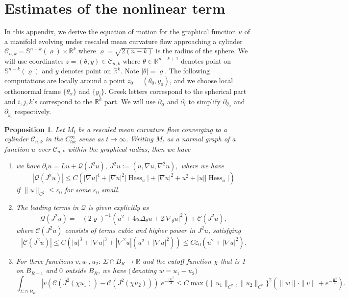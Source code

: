 \documentclass[11pt]{amsart}
\numberwithin{equation}{section}
\newtheorem{proposition}[theorem]{Proposition}
\numberwithin{equation}{section}
\newcommand{\eps}{\varepsilon}
\newcommand{\bS}{\mathbb{S}}
\newcommand{\cC}{\mathcal{C}}
\newcommand{\cQ}{\mathcal{Q}}
\newcommand{\R}{\mathbb{R}}
\newcommand{\pr}{\partial}
\DeclareMathOperator{\Hess}{Hess}
\begin{document}
	\section{Estimates of the nonlinear term}\label{appendix:Nonlinear estimate}	
	In this appendix, we derive the equation of motion for the graphical function $u$ of a manifold evolving under rescaled mean curvature flow approaching a cylinder $\cC_{n,k}=\bS^{n-k}(\varrho)\times \R^{k}$ where $\varrho=\sqrt{2(n-k)}$ is the radius of the sphere. We will use coordinates $z=(\theta, y)\in \cC_{n,k}$ where $\theta\in \R^{n-k+1}$ denotes point on $\bS^{n-k}(\varrho)$ and $y$ denotes point on $\R^{k}$. Note $|\theta|=\varrho$. The following computations are locally around a point $z_0=(\theta_0,y_0)$, and we choose local orthonormal frame $\{\theta_\alpha\}$ and $\{y_i\}$. Greek letters correspond to the spherical part and $i,j,k$'s correspond to the $\R^{k}$ part. We will use $\pr_\alpha$ and $\pr_i$ to simplify $\pr_{\theta_\alpha}$ and $\pr_{y_i}$ respectively. 
	\begin{proposition}\label{PropQ}Let $M_t$ be a rescaled mean curvature flow converging to a cylinder $\cC_{n,k}$ in the $C^\infty_{loc}$ sense as $t\to\infty$. Writing $M_t$ as a normal graph of a function $u$ over $\cC_{n,k}$ within the graphical radius, then we have  
		\begin{enumerate}
			\item 	we have
			$\partial_tu=L u+\cQ(J^2u),\ J^2u:=(u,\nabla u, \nabla^2u),$
			where we have 	\begin{equation}\label{EqQ<}
				|\cQ(J^2u)|\leq 
				C(|\nabla u|^4+|\nabla u|^2|\Hess_u|+|\nabla u|^2+u^2+|u||\Hess_u|)
			\end{equation}
			if $\|u\|_{C^2}\leq \eps_0$ for some $\eps_0$ small. 
			\item 	The leading terms in $\cQ$ is given explicitly as 
			\begin{equation}\label{EqQ}
				\cQ(J^2u)=-(2\varrho)^{-1}\left(u^2+4u\Delta_\theta u+2|\nabla_\theta u|^2\right) +\cC(J^2u),	
			\end{equation}
			where $\cC(J^2u)$ consists of terms cubic and higher power in $J^2u$, satisfying
			\begin{equation}
				|\cC(J^2u)|\leq C(|u|^3+|\nabla u|^3+|\nabla^2u|(u^2+|\nabla u|^2))\leq C\eps_0(u^2+|\nabla u|^2).
			\end{equation} 
			\item For three functions $v, u_1,u_2:\ \Sigma\cap B_R\to \R$ and the cutoff function $\chi$ that is 1 on $B_{R-1}$ and $0$ outside $B_R$, we have $($denoting $w=u_1-u_2)$\begin{equation*}\label{EqdC}
				\int_{\Sigma\cap B_R} |v 	(\cC(J^2(\chi u_1))-	\cC(J^2(\chi u_2)))|e^{-\frac{|x|^2}{4}}\leq C\max\{\|u_1\|_{C^2},\|u_2\|_{C^2}\}^2(\|w\|\cdot \|v\|+e^{-\frac{R^2}{4}}).
			\end{equation*}
		\end{enumerate}
		
		
		
	\end{proposition}
	
\end{document}
